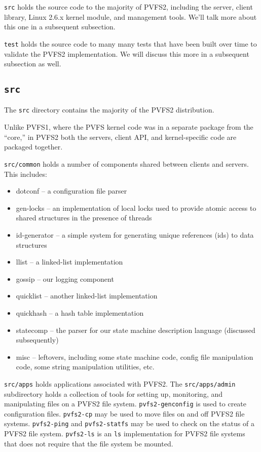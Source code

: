 \texttt{src} holds the source code to the majority of PVFS2, including the
server, client library, Linux 2.6.x kernel module, and management tools.
We'll talk more about this one in a subsequent subsection.

\texttt{test} holds the source code to many many tests that have been built
over time to validate the PVFS2 implementation.  We will discuss this more in
a subsequent subsection as well.

\subsection{\texttt{src}}

The \texttt{src} directory contains the majority of the PVFS2 distribution.

Unlike PVFS1, where the PVFS kernel code was in a separate package from the
``core,'' in PVFS2 both the servers, client API, and kernel-specific code are
packaged together.

\texttt{src/common} holds a number of components shared between clients and
servers.  This includes:
\begin{itemize}
\item dotconf -- a configuration file parser
\item gen-locks -- an implementation of local locks used to provide atomic
      access to shared structures in the presence of threads
\item id-generator -- a simple system for generating unique references (ids)
      to data structures
\item llist -- a linked-list implementation
\item gossip -- our logging component
\item quicklist -- another linked-list implementation
\item quickhash -- a hash table implementation
\item statecomp -- the parser for our state machine description language
      (discussed subsequently)
\item misc -- leftovers, including some state machine code, config file
      manipulation code, some string manipulation utilities, etc.
\end{itemize}

\texttt{src/apps} holds applications associated with PVFS2.  The
\texttt{src/apps/admin} subdirectory holds a collection of
tools for setting up, monitoring, and manipulating files on a PVFS2 file
system.  \texttt{pvfs2-genconfig} is used to create configuration files.
\texttt{pvfs2-cp} may be used to move files on
and off PVFS2 file systems.  \texttt{pvfs2-ping} and \texttt{pvfs2-statfs} may
be used to check on the status of a PVFS2 file system.  \texttt{pvfs2-ls} is
an \texttt{ls} implementation for PVFS2 file systems that does not require
that the file system be mounted.

